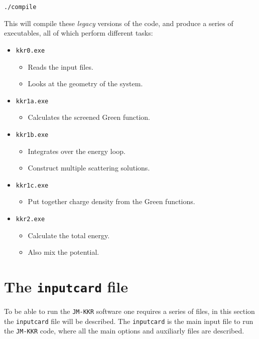 \documentclass[11pt,fleqn]{book} %
\begin{document}
\begin{VBox}
\begin{verbatim}
./compile
\end{verbatim}
\end{VBox}

This will compile these \textit{legacy} versions of the code, and produce a series of executables, all of which perform different tasks:

\begin{itemize}

\item \verb;kkr0.exe;
\begin{itemize}
\item Reads the input files.
\item Looks at the geometry of the system.
\end{itemize}

\item \verb;kkr1a.exe;
\begin{itemize}
\item Calculates the screened Green function.
\end{itemize}

\item \verb;kkr1b.exe;
\begin{itemize}
\item Integrates over the energy loop.
\item Construct multiple scattering solutions.
\end{itemize}

\item \verb;kkr1c.exe;
\begin{itemize}
\item Put together charge density from the Green functions.
\end{itemize}

\item \verb;kkr2.exe;
\begin{itemize}
\item Calculate the total energy.
\item Also mix the potential.
\end{itemize}

\end{itemize}


\section{The \texttt{inputcard} file}
To be able to run the \verb;JM-KKR; software one requires a series of files, in this section the \verb;inputcard; file will be described. The \verb;inputcard; is the main input file to run the \verb;JM-KKR; code, where all the main options and auxiliarly files are described.
\end{document}
